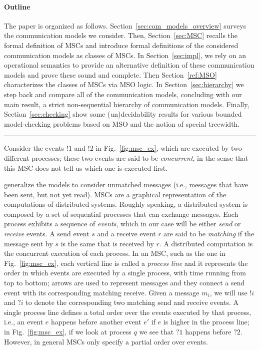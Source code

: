 \paragraph{\bf Outline} The paper is organized as follows. Section~\ref{sec:com_models_overview} surveys the communication models we consider.  Then, Section~\ref{sec:MSC} recalls the formal definition of MSCs and introduce formal definitions of the considered communication models as classes of MSCs. 
In Section~\ref{sec:impl}, we rely on
an operational semantics to provide an alternative definition of these communication models and prove these sound and complete. 
Then Section~\ref{ref:MSO} characterizes the classes of MSCs via MSO logic. 
In Section~\ref{sec:hierarchy} we step back and compare all of the communication models, concluding with our main result, a strict non-sequential hierarchy of communication models. 
Finally, Section~\ref{sec:checking} show some (un)decidability results for various bounded model-checking
problems based on MSO and the notion of special treewidth.


\hrule

\bigskip


Consider the events $!1$ and $!2$ in Fig.~\ref{fig:msc_ex}, which are executed by two different processes; these two events are said to be \emph{concurrent}, in the sense that this MSC does not tell us which one is executed first. 

generalize the models to  consider unmatched messages (i.e., messages that have been sent, but not yet read). 
MSCs are a graphical representation of the  computations of distributed systems.  Roughly speaking, a distributed system is composed by a set of sequential processes that can exchange messages. Each process exhibits a sequence of \emph{events}, which in our case will be either \emph{send} or \emph{receive} events. A send event $s$ and a receive event $r$ are said to be \emph{matching} if the message sent by $s$ is the same  that is received by $r$. A distributed computation is the concurrent execution of each process. In an MSC, such as the one in Fig.~\ref{fig:msc_ex}, each vertical line is called a \emph{process line} and it represents the order in which events are executed by a single process, with time running from top to bottom; arrows are used to represent messages and they connect a send event with its corresponding matching receive. 
Given a message $m_i$, we will use $!i$ and $?i$ to denote the corresponding two matching send and receive events. A single process line defines a total order over the events executed by that process, i.e., an event $e$ happens before another event $e'$ if $e$ is higher in the process line; in Fig.~\ref{fig:msc_ex}, if we look at process $q$ we see that $?1$ happens before $?2$. However, in general MSCs only specify a partial order over events. 


